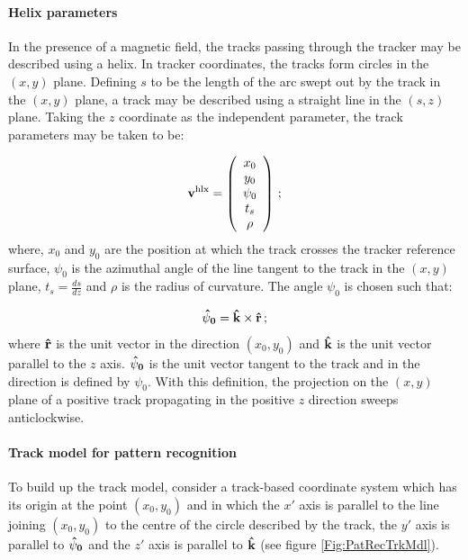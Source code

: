 \paragraph{Helix parameters}

In the presence of a magnetic field, the tracks passing through the tracker may be described using a helix. In tracker coordinates, the tracks form circles in the $(x, y)$ plane. Defining $s$ to be the length of the arc swept out by the track in the $(x, y)$ plane, a track may be described using a straight line in the $(s, z)$ plane. Taking the $z$ coordinate as the independent parameter, the track parameters may be taken to be:

\begin{equation}
 {\bf v^{\rm hlx}} =
 \left( 
   \begin{array}{c}
     x_0    \\
     y_0    \\
     \psi_0 \\
     t_s    \\
     \rho
   \end{array}
   \right)\,;
\end{equation}
where, $x_0$ and $y_0$ are the position at which the track crosses the tracker reference surface, $\psi_0$ is the azimuthal angle of the line tangent to the track in the $(x, y)$ plane, $t_s = \frac{ds}{dz}$ and $\rho$ is the radius of curvature. The angle $\psi_0$ is chosen such that:

\begin{equation}
  {\bf \hat{\psi}_0} = {\bf \hat{k}} \times {\bf \hat{r}} \, ;
\end{equation}
where ${\bf \hat{r}}$ is the unit vector in the direction $(x_0, y_0)$ and ${\bf \hat{k}}$ is the unit vector parallel to the $z$ axis. ${\bf \hat{\psi}_0}$ is the unit vector tangent to the track and in the direction is defined by $\psi_0$. With this definition, the projection on the $(x, y)$ plane of a positive track propagating in the positive $z$ direction sweeps anticlockwise.

\paragraph{Track model for pattern recognition}

To build up the track model, consider a track-based coordinate system which has its origin at the point $(x_0, y_0)$ and in which the $x'$ axis is parallel to the line joining $(x_0, y_0)$ to the centre of the circle described by the track, the $y'$ axis is parallel to ${\bf \hat{\psi}_0}$ and the $z'$ axis is parallel to ${\bf \hat{k}}$ (see figure \ref{Fig:PatRecTrkMdl}).

